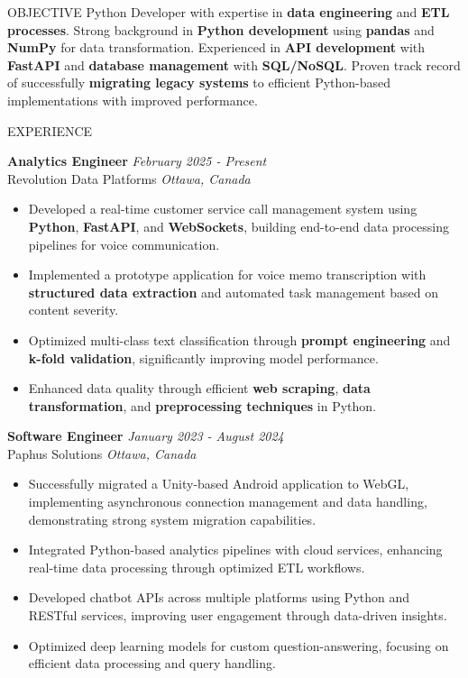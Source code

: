\documentclass{resume}
\begin{document}
\begin{rSection}{OBJECTIVE}
Python Developer with expertise in \textbf{data engineering} and \textbf{ETL processes}. Strong background in \textbf{Python development} using \textbf{pandas} and \textbf{NumPy} for data transformation. Experienced in \textbf{API development} with \textbf{FastAPI} and \textbf{database management} with \textbf{SQL/NoSQL}. Proven track record of successfully \textbf{migrating legacy systems} to efficient Python-based implementations with improved performance.
\end{rSection}


\begin{rSection}{EXPERIENCE}

\textbf{Analytics Engineer} \hfill \textit{February 2025 - Present}\\
Revolution Data Platforms \hfill \textit{Ottawa, Canada}
 \begin{itemize}
    \itemsep -3pt {} 
    \item Developed a real-time customer service call management system using \textbf{Python}, \textbf{FastAPI}, and \textbf{WebSockets}, building end-to-end data processing pipelines for voice communication.
    \item Implemented a prototype application for voice memo transcription with \textbf{structured data extraction} and automated task management based on content severity.
    \item Optimized multi-class text classification through \textbf{prompt engineering} and \textbf{k-fold validation}, significantly improving model performance.
    \item Enhanced data quality through efficient \textbf{web scraping}, \textbf{data transformation}, and \textbf{preprocessing techniques} in Python.
 \end{itemize}
 
\textbf{Software Engineer} \hfill \textit{January 2023 - August 2024}\\
Paphus Solutions \hfill \textit{Ottawa, Canada}
 \begin{itemize}
    \itemsep -3pt {} 
    \item Successfully migrated a Unity-based Android application to WebGL, implementing asynchronous connection management and data handling, demonstrating strong system migration capabilities.
    \item Integrated Python-based analytics pipelines with cloud services, enhancing real-time data processing through optimized ETL workflows.
    \item Developed chatbot APIs across multiple platforms using Python and RESTful services, improving user engagement through data-driven insights.
    \item Optimized deep learning models for custom question-answering, focusing on efficient data processing and query handling.
 \end{itemize}
 

\end{rSection}
\end{document}
